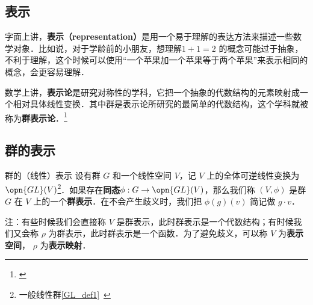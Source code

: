 

\subsection{表示}

字面上讲，\textbf{表示（representation）}是用一个易于理解的表达方法来描述一些数学对象．比如说，对于学龄前的小朋友，想理解$1+1=2$ 的概念可能过于抽象，不利于理解，这个时候可以使用“一个苹果加一个苹果等于两个苹果”来表示相同的概念，会更容易理解．

数学上讲，\textbf{表示论}是研究对称性的学科，它把一个抽象的代数结构的元素映射成一个相对具体线性变换．其中群是表示论所研究的最简单的代数结构，这个学科就被称为\textbf{群表示论}．\footnote{\cite{GTM222}\cite{维声表示}}

\subsection{群的表示}

% 
% 
% 
% 

\begin{definition}{群的（线性）表示}
设有群 $G$ 和一个线性空间 $V$，记 $V$ 上的全体可逆线性变换为 $\opn{GL}(V)$\footnote{一般线性群\autoref{GL_def1}~}．如果存在\textbf{同态}$\phi: G\rightarrow \opn{GL}(V)$，那么我们称 $(V, \phi)$ 是群 $G$ 在 $V$ 上的一个\textbf{群表示}．在不会产生歧义时，我们把 $\phi(g)(v)$ 简记做 $g \cdot v$．
\end{definition}

注：有些时候我们会直接称 $V$ 是群表示，此时群表示是一个代数结构；有时候我们又会称 $\rho$ 为群表示，此时群表示是一个函数．为了避免歧义，可以称 $V$ 为\textbf{表示空间}， $\rho$ 为\textbf{表示映射}．

